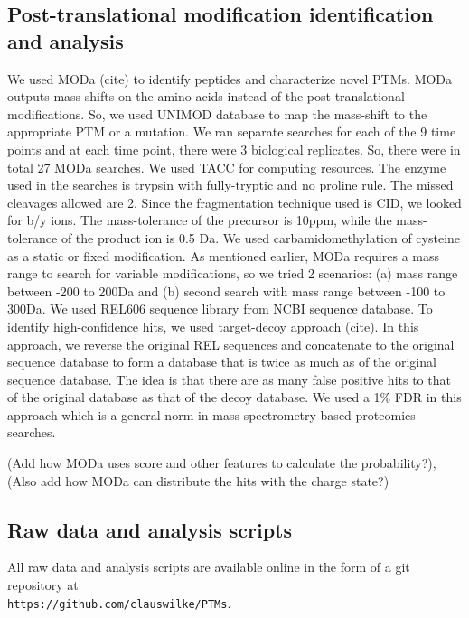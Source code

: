 \documentclass[12pt]{article}
\begin{document}
\subsection{Post-translational modification identification and analysis} 
We used MODa (cite) to identify peptides and characterize novel PTMs. MODa outputs mass-shifts on the amino acids instead of the post-translational modifications. So, we used UNIMOD database to map the mass-shift to the appropriate PTM or a mutation. We ran separate searches for each of the 9 time points and at each time point, there were 3 biological replicates. So, there were in total 27 MODa searches. We used TACC for computing resources. The enzyme used in the searches is trypsin with fully-tryptic and no proline rule. The missed cleavages allowed are 2. Since the fragmentation technique used is CID, we looked for b/y ions. The mass-tolerance of the precursor is 10ppm, while the mass-tolerance of the product ion is 0.5 Da. We used carbamidomethylation of cysteine as a static or fixed modification. As mentioned earlier, MODa requires a mass range to search for variable modifications, so we tried 2 scenarios: (a) mass range between -200 to 200Da and (b) second search with mass range between -100 to 300Da. We used REL606 sequence library from NCBI sequence database. To identify high-confidence hits, we used target-decoy approach (cite). In this approach, we reverse the original REL sequences and concatenate to the original sequence database to form a database that is twice as much as of the original sequence database. The idea is that there are as many false positive hits to that of the original database as that of the decoy database. We used a 1\% FDR in this approach which is a general norm in mass-spectrometry based proteomics searches.

(Add how MODa uses score and other features to calculate the probability?), (Also add how MODa can distribute the hits with the charge state?)

\subsection{Raw data and analysis scripts}

All raw data and analysis scripts are available online in the form of a git repository at\\ \texttt{https://github.com/clauswilke/PTMs}.

\end{document}
